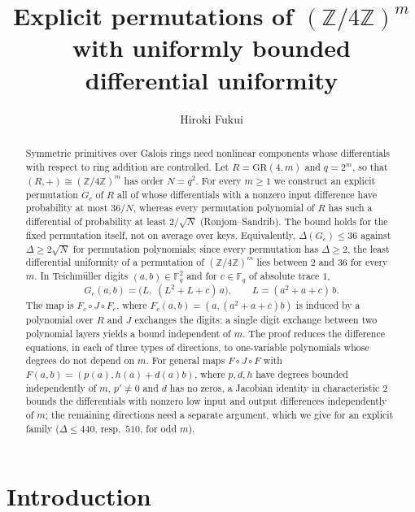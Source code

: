 \documentclass[11pt]{amsart}
\title[Bounded differential uniformity on $(\mathbb Z/4\mathbb Z)^m$]{Explicit permutations of $(\mathbb Z/4\mathbb Z)^m$\\ with uniformly bounded differential uniformity}
\author{Hiroki Fukui}
\theoremstyle{definition}
\newcommand{\Fq}{\mathbb{F}_q}
\newcommand{\GR}{\mathrm{GR}}
\begin{document}
\begin{abstract}
Symmetric primitives over Galois rings need nonlinear components whose differentials with respect to ring addition are
controlled. Let $R=\GR(4,m)$ and $q=2^m$, so that $(R,+)\cong(\mathbb Z/4\mathbb Z)^m$ has order $N=q^2$. For every $m\ge1$ we
construct an explicit permutation $G_c$ of $R$ all of whose differentials with a nonzero input difference have probability at most
$36/N$, whereas every permutation polynomial of $R$ has such a differential of probability at least $2/\sqrt N$
(R{\o}njom--Sandrib). The bound holds for the fixed permutation itself, not on average over keys. Equivalently, $\Delta(G_c)\le36$
against $\Delta\ge2\sqrt N$ for permutation polynomials; since every permutation has $\Delta\ge2$, the least differential
uniformity of a permutation of $(\mathbb Z/4\mathbb Z)^m$ lies between $2$ and $36$ for every $m$. In Teichm\"uller digits $(a,b)\in\Fq^2$ and for $c\in\Fq$ of
absolute trace $1$,
\[
G_c(a,b)=\bigl(L,\;(L^2+L+c)\,a\bigr),\qquad L=(a^2+a+c)\,b .
\]
The map is $F_c\circ J\circ F_c$, where $F_c(a,b)=(a,(a^2+a+c)b)$ is induced by a polynomial over $R$ and $J$ exchanges the
digits: a single digit exchange between two polynomial layers yields a bound independent of $m$.
The proof reduces the difference equations, in each of three types of directions, to one-variable polynomials whose degrees do
not depend on $m$. For general maps $F\circ J\circ F$ with $F(a,b)=(p(a),h(a)+d(a)b)$, where $p,d,h$ have degrees bounded
independently of $m$, $p'\ne0$ and $d$ has no zeros, a Jacobian identity in characteristic $2$ bounds the differentials with
nonzero low input and output differences independently of $m$; the remaining directions need a separate argument, which we give
for an explicit family ($\Delta\le440$, resp.\ $510$, for odd $m$).
\end{abstract}
\maketitle

\section{Introduction}
\end{document}
